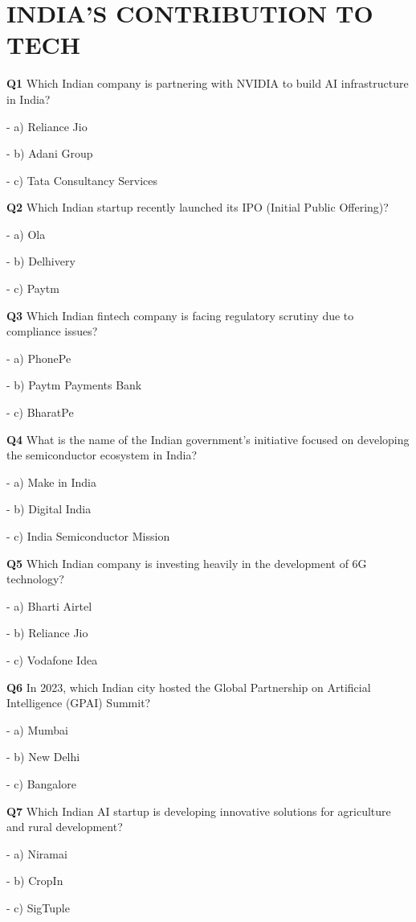 \section{INDIA'S CONTRIBUTION TO TECH}

\textbf{Q1} Which Indian company is partnering with NVIDIA to build AI infrastructure in India?\par
\quad - a) Reliance Jio\par
\quad - b) Adani Group\par
\quad - c) Tata Consultancy Services\par

\textbf{Q2} Which Indian startup recently launched its IPO (Initial Public Offering)?\par
\quad - a) Ola\par
\quad - b) Delhivery\par
\quad - c) Paytm\par

\textbf{Q3} Which Indian fintech company is facing regulatory scrutiny due to compliance issues?\par
\quad - a) PhonePe\par
\quad - b) Paytm Payments Bank\par
\quad - c) BharatPe\par

\textbf{Q4} What is the name of the Indian government's initiative focused on developing the semiconductor ecosystem in India?\par
\quad - a) Make in India\par
\quad - b) Digital India\par
\quad - c) India Semiconductor Mission\par

\textbf{Q5} Which Indian company is investing heavily in the development of 6G technology?\par
\quad - a) Bharti Airtel\par
\quad - b) Reliance Jio\par
\quad - c) Vodafone Idea\par

\textbf{Q6} In 2023, which Indian city hosted the Global Partnership on Artificial Intelligence (GPAI) Summit?\par
\quad - a) Mumbai\par
\quad - b) New Delhi\par
\quad - c) Bangalore\par

\textbf{Q7} Which Indian AI startup is developing innovative solutions for agriculture and rural development?\par
\quad - a) Niramai\par
\quad - b) CropIn\par
\quad - c) SigTuple\par

